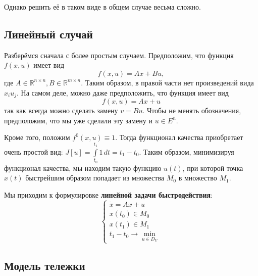 Однако решить её в таком виде в общем случае весьма сложно.

\subsection{Линейный случай}

Разберёмся сначала с более простым случаем.
Предположим, что функция $f(x, u)$ имеет вид
\begin{equation}
    f(x, u) = Ax + Bu,
\end{equation}
где $A \in \mathbb{R}^{n \times n}, B \in \mathbb{R}^{m \times n}$.
Таким образом, в правой части нет произведений вида $x_i u_j$.
На самом деле, можно даже предположить, что функция имеет вид 
\begin{equation}
    f(x, u) = Ax + u
\end{equation}
так как всегда можно сделать замену $v = Bu$.
Чтобы не менять обозначения, предположим, что мы уже сделали эту замену и $u \in E^n$.

Кроме того, положим $f^0(x, u) \equiv 1$.
Тогда функционал качества приобретает очень простой вид: $J[u] = \int\limits_{t_0}^{t_1} 1 \, dt = t_1 - t_0.$
Таким образом, минимизируя функционал качества, мы находим такую функцию $u(t)$, 
при которой точка $x(t)$ быстрейшим образом попадает из множества $M_0$ в множество $M_1$.

Мы приходим к формулировке \textbf{линейной задачи быстродействия}:
\begin{equation}
    \label{lection1:linear_perfom_problem}
    \begin{cases}
        \dot{x} = Ax + u \\
        x(t_0) \in M_0 \\
        x(t_1) \in M_1 \\
        t_1 - t_0 \rightarrow \min\limits_{u \in D_U}
    \end{cases}
\end{equation}

\subsection{Модель тележки}

\begin{center}
\end{center}

